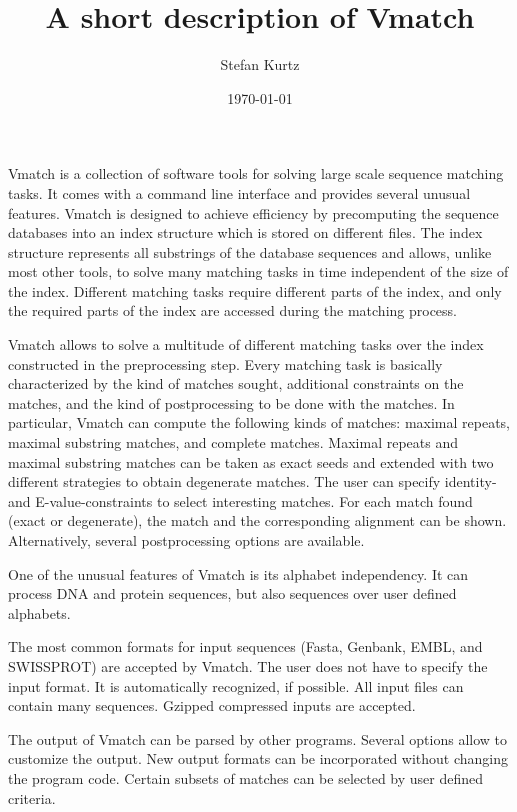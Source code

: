 \documentclass[12pt]{article}
\author{Stefan Kurtz}
\title{\textbf{
A short description of Vmatch
}}
\date{\today}
\begin{document}
\maketitle

Vmatch is a 
collection of software tools for 
solving large scale sequence matching tasks. It comes with a 
command line interface and provides several 
unusual features.
Vmatch is designed to achieve
efficiency by precomputing the sequence databases into an
index structure which is stored on different files.
The index structure 
represents all substrings of the database sequences and allows,
unlike most other tools, to solve
many matching tasks in time 
independent of the size of the index. Different matching
tasks require different parts of the index, and only the 
required parts of the index are accessed during the matching process.

Vmatch allows to solve a multitude of different matching tasks 
over the index constructed in the preprocessing step. 
Every matching task is basically characterized by
the kind of matches sought,
additional constraints on the matches, and
the kind of postprocessing to be done with the matches.
In particular, Vmatch can compute the following kinds of matches:
maximal repeats, maximal substring matches, and complete matches.  
Maximal repeats and maximal substring matches can be taken as 
exact seeds and extended with two different strategies to obtain 
degenerate matches. The user can specify identity- and E-value-constraints
to select interesting matches. For each match found (exact or 
degenerate), the match and the corresponding alignment can be
shown. Alternatively, several postprocessing options are
available.

One of the 
unusual features of Vmatch is its alphabet
independency. It can process DNA and protein sequences,
but also sequences over 
user defined alphabets.

The most common formats for input sequences (Fasta, Genbank, EMBL, and
SWISSPROT) are accepted by Vmatch. The user does not have to specify 
the input
format. It is automatically recognized, if possible. All input files can contain
many sequences. 
Gzipped compressed inputs are accepted.

The output of Vmatch 
can be parsed by other programs. 
Several options allow to customize the output.
New output formats can be incorporated without changing the 
program code. Certain subsets of matches can be selected by
user defined criteria.
\end{document}
